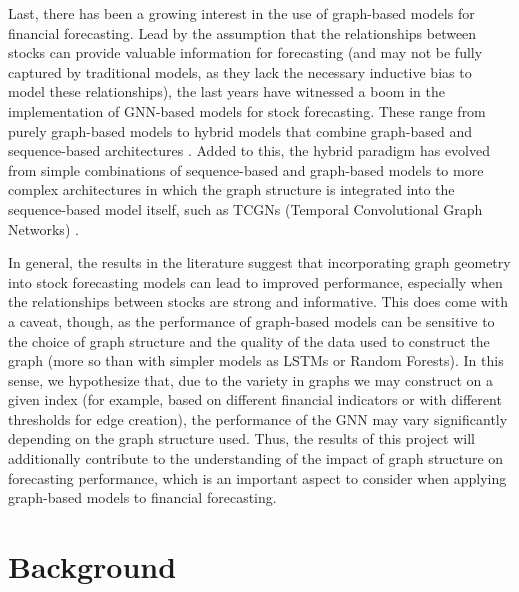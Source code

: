 \documentclass{article}
\begin{document}
Last, there has been a growing interest in the use of graph-based models for financial forecasting. Lead by the assumption that the relationships between stocks can provide valuable information for forecasting (and may not be fully captured by traditional models, as they lack the necessary inductive bias to model these relationships), the last years have witnessed a boom in the implementation of GNN-based models for stock forecasting. These range from purely graph-based models \cite{gnn_stock_prediction} to hybrid models that combine graph-based and sequence-based architectures \cite{survey_temporal_gnn,lstm_plus_gnn_stock_prediction}. Added to this, the hybrid paradigm has evolved from simple combinations of sequence-based and graph-based models to more complex architectures in which the graph structure is integrated into the sequence-based model itself, such as TCGNs (Temporal Convolutional Graph Networks) \cite{temporal_gnn_stock_prediction}.

In general, the results in the literature suggest that incorporating graph geometry into stock forecasting models can lead to improved performance, especially when the relationships between stocks are strong and informative. This does come with a caveat, though, as the performance of graph-based models can be sensitive to the choice of graph structure and the quality of the data used to construct the graph (more so than with simpler models as LSTMs or Random Forests). In this sense, we hypothesize that, due to the variety in graphs we may construct on a given index (for example, based on different financial indicators or with different thresholds for edge creation), the performance of the GNN may vary significantly depending on the graph structure used. Thus, the results of this project will additionally contribute to the understanding of the impact of graph structure on forecasting performance, which is an important aspect to consider when applying graph-based models to financial forecasting.

\section{Background}
\end{document}
